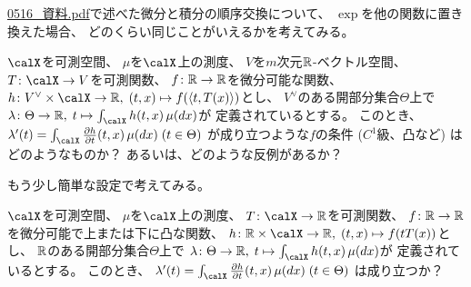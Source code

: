 \documentclass[report]{jlreq}
\begin{document}
%

\url{0516_資料.pdf}で述べた微分と積分の順序交換について、
$\exp$を他の関数に置き換えた場合、
どのくらい同じことがいえるかを考えてみる。

\begin{problem}
    $\calX$を可測空間、
    $\mu$を$\calX$上の測度、
    $V$を$m$次元$\mathbb{R}$-ベクトル空間、
    $T \colon \calX \to V$を可測関数、
    $f \colon \mathbb{R} \to \mathbb{R}$を微分可能な関数、
    $h \colon V^\vee \times \calX \to \R, \; (t, x) \mapsto f(\myangle{t}{T(x)})$とし、
    $V^\vee$のある開部分集合$\Theta$上で
    $\lambda \colon \Theta \to \R, \; t \mapsto \int_\calX h(t, x) \, \mu(dx)$が
    定義されているとする。
    このとき、
    $\lambda'(t) = \int_\calX \deldel[h]{t} (t, x) \, \mu(dx) \; (t \in \Theta)$
    が成り立つような$f$の条件 ($C^1$級、凸など) はどのようなものか？
    あるいは、どのような反例があるか？
\end{problem}

もう少し簡単な設定で考えてみる。

\begin{problem}
    $\calX$を可測空間、
    $\mu$を$\calX$上の測度、
    $T \colon \calX \to \R$を可測関数、
    $f \colon \mathbb{R} \to \mathbb{R}$を微分可能で上または下に凸な関数、
    $h \colon \R \times \calX \to \R, \; (t, x) \mapsto f(tT(x))$とし、
    $\mathbb{R}$のある開部分集合$\Theta$上で
    $\lambda \colon \Theta \to \R, \; t \mapsto \int_\calX h(t, x) \, \mu(dx)$が
    定義されているとする。
    このとき、
    $\lambda'(t) = \int_\calX \deldel[h]{t} (t, x) \, \mu(dx) \; (t \in \Theta)$
    は成り立つか？
\end{problem}
\end{document}
